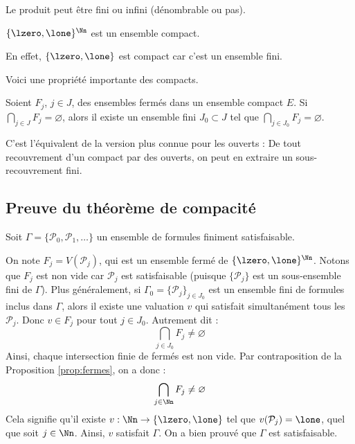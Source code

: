 \documentclass[11pt,class=report,crop=false]{standalone}
\begin{document}
Le produit peut être fini ou infini (dénombrable ou pas).

\begin{corollaire}
	$\{\lzero,\lone\}^\Nn$ est un ensemble compact.
\end{corollaire}

En effet, $\{\lzero,\lone\}$ est compact car c'est un ensemble fini.

Voici une propriété importante des compacts.
\begin{proposition}
	\label{prop:fermes}
	Soient $F_j$, $j\in J$, des ensembles fermés dans un ensemble compact $E$.
	Si $\bigcap_{j\in J} F_j = \varnothing$, alors il existe un ensemble fini $J_0 \subset J$ tel que
	$\bigcap_{j\in J_0} F_j = \varnothing$.
\end{proposition}

C'est l'équivalent de la version plus connue pour les ouverts : \og{}De tout recouvrement d'un compact par des ouverts, on peut en extraire un sous-recouvrement fini.\fg{}


\subsection{Preuve du théorème de compacité}

Soit $\Gamma = \{ \mathcal{P}_0, \mathcal{P}_1,\ldots \}$ un ensemble de formules finiment satisfaisable. 

On note $F_j = V(\mathcal{P}_j)$, qui est un ensemble fermé de $\{\lzero,\lone\}^\Nn$.
Notons que $F_j$ est non vide car $\mathcal{P}_j$ est satisfaisable (puisque $\{\mathcal{P}_j\}$ est un sous-ensemble fini de $\Gamma$). Plus généralement, si $\Gamma_0 = \{ \mathcal{P}_{j} \}_{j\in J_0}$ est un ensemble fini de formules inclus dans $\Gamma$, alors il existe une valuation $v$ qui satisfait simultanément tous les $\mathcal{P}_{j}$. Donc $v \in F_{j}$ pour tout $j \in J_0$. Autrement dit :
\[
\bigcap_{j \in J_0} F_j \neq \varnothing
\]
Ainsi, chaque intersection finie de fermés est non vide.
Par contraposition de la Proposition \ref{prop:fermes}, on a donc :
\[
\bigcap_{j \in \Nn} F_j \neq \varnothing
\]
Cela signifie qu'il existe  $v : \Nn \to \{\lzero,\lone\}$ tel que $v(\mathcal{P}_j) = \lone$, quel que soit $j \in \Nn$. Ainsi, $v$ satisfait $\Gamma$. On a bien prouvé que $\Gamma$ est satisfaisable. 



\end{document}
